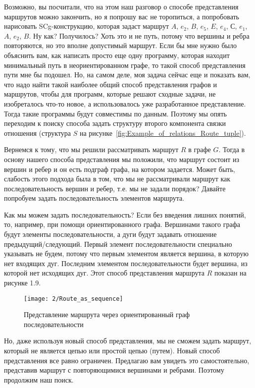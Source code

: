 Возможно, вы посчитали, что на этом наш разговор о способе
представления маршрутов можно закончить, но я попрошу вас не
торопиться, а попробовать нарисовать SCg-конструкцию, которая задаст
маршрут $A$, $e_2$, $B$, $e_5$, $E$, $e_4$, $С$, $e_1$, $A$, $e_2$,
$B$. Ну как? Получилось? Хоть это и не путь, потому что вершины и
ребра повторяются, но это вполне допустимый маршрут. Если бы мне нужно
было объяснить вам, как написать просто еще одну программу, которая
находит минимальный путь в неориентированном графе, то такой способ
представления пути мне бы подошел. Но, на самом деле, моя задача
сейчас еще и показать вам, что надо найти такой наиболее общий способ
представления графов и маршрутов, чтобы для программ, которые решают
сходные задачи, не изобреталось что-то новое, а использовалось уже
разработанное представление. Тогда такие программы будут совместимы по
данным. Поэтому мы опять переходим к поиску способа задать структуру
второго компонента связки отношения  (структура $S$ на
рисунке~\ref{fig:Example_of_relations_Route_tuple}).

Вернемся к тому, что мы решили рассматривать маршрут $R$ в графе
$G$. Тогда в основу нашего способа представления мы положили, что
маршрут состоит из вершин и ребер и он есть подграф графа, на котором
задается. Может быть, слабость этого подхода была в том, что мы не
рассматривали маршрут как последовательность вершин и ребер, т.е. мы
не задали порядок? Давайте попробуем задать последовательность
элементов маршрута.

Как мы можем задать последовательность? Если без введения лишних
понятий, то, например, при помощи ориентированного графа. Вершинами
такого графа будут элементы последовательности, а дуги будут задавать
отношение предыдущий/следующий. Первый элемент последовательности
специально указывать не будем, потому что первым элементом является
вершина, в которую нет входящих дуг. Последним элементом
последовательности будет вершина, из которой нет исходящих дуг. Этот
способ представления маршрута $R$ показан на рисунке 1.9.

\begin{figure}
  \centering
  \texttt{[image: 2/Route\_as\_sequence]}
  \caption{Представление маршрута через ориентированный граф последовательности}
  \label{fig:Route_as_sequence}
\end{figure}

Но, даже используя новый способ представления, мы не сможем задать
маршрут, который не является цепью или простой цепью (путем). Новый
способ представления все равно ограничен. Предлагаю вам увидеть это
самостоятельно, представив маршрут с повторяющимися вершинами и
ребрами. Поэтому продолжим наш поиск.

